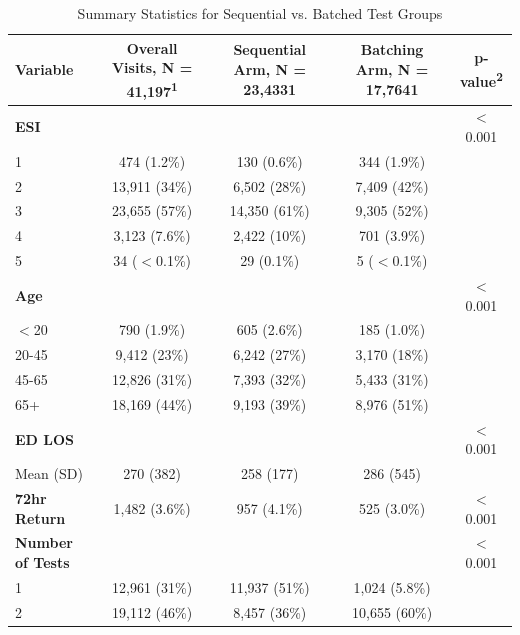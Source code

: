 \documentclass[,,nonblindrev]{informs}
\begin{document}
\begin{table}[htbp]
\centering
\tiny
\caption{Summary Statistics for Sequential vs. Batched Test Groups}
\begin{tabular}{lcccc}
\hline
Variable & \multicolumn{1}{c}{Overall Visits, N = 41,197\textsuperscript{1}} & \multicolumn{1}{c}{Sequential Arm, N = 23,4331} & \multicolumn{1}{c}{Batching Arm, N = 17,7641} & \multicolumn{1}{c}{p-value\textsuperscript{2}} \\
\hline
\textbf{ESI} & & & & $<$0.001 \\
\hspace{0.5cm} 1 & 474 (1.2\%) & 130 (0.6\%) & 344 (1.9\%) & \\
\hspace{0.5cm} 2 & 13,911 (34\%) & 6,502 (28\%) & 7,409 (42\%) & \\
\hspace{0.5cm} 3 & 23,655 (57\%) & 14,350 (61\%) & 9,305 (52\%) & \\
\hspace{0.5cm} 4 & 3,123 (7.6\%) & 2,422 (10\%) & 701 (3.9\%) & \\
\hspace{0.5cm} 5 & 34 ($<$0.1\%) & 29 (0.1\%) & 5 ($<$0.1\%) & \\
\hline
\textbf{Age} & & & & $<$0.001 \\
\hspace{0.5cm} $<$20 & 790 (1.9\%) & 605 (2.6\%) & 185 (1.0\%) & \\
\hspace{0.5cm} 20-45 & 9,412 (23\%) & 6,242 (27\%) & 3,170 (18\%) & \\
\hspace{0.5cm} 45-65 & 12,826 (31\%) & 7,393 (32\%) & 5,433 (31\%) & \\
\hspace{0.5cm} 65+ & 18,169 (44\%) & 9,193 (39\%) & 8,976 (51\%) & \\
\hline
\textbf{ED LOS} & & & & $<$0.001 \\
\hspace{0.5cm} Mean (SD) & 270 (382) & 258 (177) & 286 (545) & \\
\hline
\textbf{72hr Return} & 1,482 (3.6\%) & 957 (4.1\%) & 525 (3.0\%) & $<$0.001 \\
\hline
\textbf{Number of Tests} & & & & $<$0.001 \\
\hspace{0.5cm} 1 & 12,961 (31\%) & 11,937 (51\%) & 1,024 (5.8\%) & \\
\hspace{0.5cm} 2 & 19,112 (46\%) & 8,457 (36\%) & 10,655 (60\%) & \\

\end{tabular}
\end{table}
\end{document}

